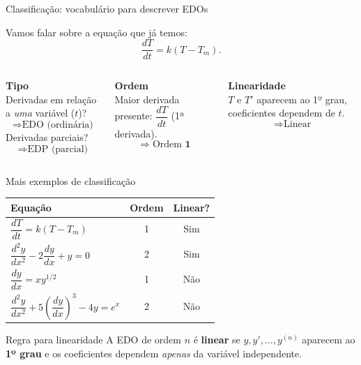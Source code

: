 \documentclass[12pt]{beamer}
\begin{document}
\begin{frame}{Classificação: vocabulário para descrever EDOs}

  Vamos falar sobre a equação que já temos:
  \[
    \frac{dT}{dt} = k(T - T_m).
  \]

  \vspace{6pt}
  \begin{columns}[T]

      \textbf{Tipo}\\[4pt]
      Derivadas em relação a \emph{uma} variável ($t$)?
      \[
        \Rightarrow \text{EDO (ordinária)}
      \]
      \vspace{4pt}
      Derivadas parciais?
      \[
        \Rightarrow \text{EDP (parcial)}
      \]

      \textbf{Ordem}\\[4pt]
      Maior derivada presente: $\dfrac{dT}{dt}$ (1ª derivada).
      \[
        \Rightarrow \text{Ordem } \mathbf{1}
      \]

      \vspace{6pt}
      \textbf{Linearidade}\\[4pt]
      $T$ e $T'$ aparecem ao 1º grau, coeficientes dependem de $t$.
      \[
        \Rightarrow \text{Linear}
      \]

  \end{columns}

\end{frame}

\begin{frame}{Mais exemplos de classificação}

  \begin{center}
  \renewcommand{\arraystretch}{2.0}
  \begin{tabular}{lcc}
    \hline
    \textbf{Equação} & \textbf{Ordem} & \textbf{Linear?} \\
    \hline
    $\dfrac{dT}{dt} = k(T - T_m)$
      & 1 & Sim \\
    $\dfrac{d^2y}{dx^2} - 2\dfrac{dy}{dx} + y = 0$
      & 2 & Sim \\
    $\dfrac{dy}{dx} = xy^{1/2}$
      & 1 & Não \\
    $\dfrac{d^2y}{dx^2} + 5\!\left(\dfrac{dy}{dx}\right)^{\!3} - 4y = e^x$
      & 2 & Não \\
    \hline
  \end{tabular}
  \end{center}

  \vspace{8pt}
  \pause

  \begin{alertblock}{Regra para linearidade}
    A EDO de ordem $n$ é \textbf{linear} se $y, y', \ldots, y^{(n)}$
    aparecem ao \textbf{1º grau} e os coeficientes dependem
    \emph{apenas} da variável independente.
  \end{alertblock}

\end{frame}
\end{document}
